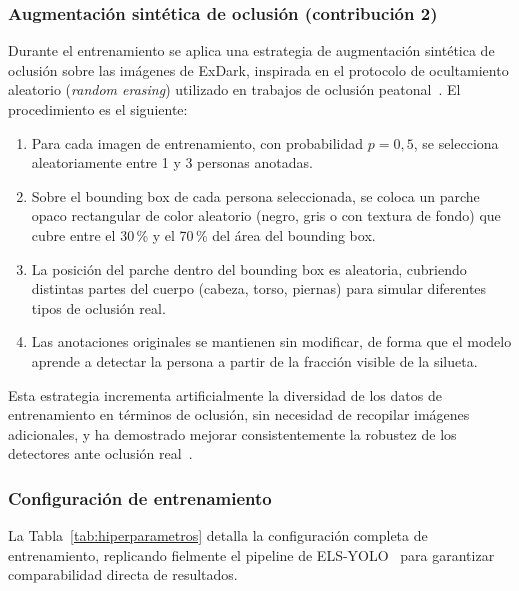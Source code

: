 \subsubsection{Augmentaci\'on sint\'etica de oclusi\'on
(contribuci\'on 2)}

Durante el entrenamiento se aplica una estrategia de augmentaci\'on
sint\'etica de oclusi\'on sobre las im\'agenes de ExDark, inspirada
en el protocolo de ocultamiento aleatorio (\textit{random erasing})
utilizado en trabajos de oclusi\'on peatonal~\cite{Hu2025, Kim2025}.
El procedimiento es el siguiente:

\begin{enumerate}
  \item Para cada imagen de entrenamiento, con probabilidad
        $p = 0{,}5$, se selecciona aleatoriamente entre 1 y 3
        personas anotadas.
  \item Sobre el bounding box de cada persona seleccionada, se
        coloca un parche opaco rectangular de color aleatorio
        (negro, gris o con textura de fondo) que cubre entre el
        30\,\% y el 70\,\% del \'area del bounding box.
  \item La posici\'on del parche dentro del bounding box es
        aleatoria, cubriendo distintas partes del cuerpo (cabeza,
        torso, piernas) para simular diferentes tipos de oclusi\'on
        real.
  \item Las anotaciones originales se mantienen sin modificar, de
        forma que el modelo aprende a detectar la persona a partir
        de la fracci\'on visible de la silueta.
\end{enumerate}

Esta estrategia incrementa artificialmente la diversidad de los
datos de entrenamiento en t\'erminos de oclusi\'on, sin necesidad
de recopilar im\'agenes adicionales, y ha demostrado mejorar
consistentemente la robustez de los detectores ante oclusi\'on
real~\cite{Tang2026}.

\subsubsection{Configuraci\'on de entrenamiento}

La Tabla~\ref{tab:hiperparametros} detalla la configuraci\'on
completa de entrenamiento, replicando fielmente el pipeline de
ELS-YOLO~\cite{ElsYolo2025} para garantizar comparabilidad directa
de resultados.

